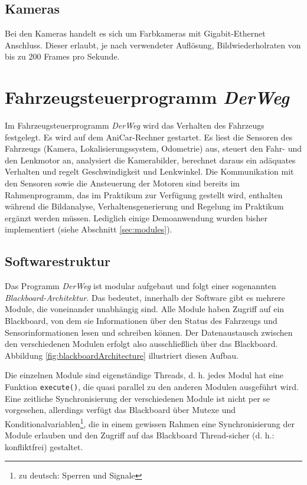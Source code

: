 \documentclass[a4paper, 11pt]{article}
\newcommand{\code}[1]{\texttt{#1}}
\newcommand{\DerWeg}{\textit{DerWeg }}  %
\begin{document}
{\subsection{Kameras}
Bei den Kameras handelt es sich um Farbkameras mit Gigabit-Ethernet Anschluss. Dieser erlaubt, je nach verwendeter Auflösung, Bildwiederholraten von bis zu 200 Frames pro Sekunde.

\section{Fahrzeugsteuerprogramm \DerWeg}

Im Fahrzeugsteuerprogramm \DerWeg wird das Verhalten des Fahrzeugs festgelegt. Es wird auf dem AniCar-Rechner gestartet. Es liest die Sensoren des Fahrzeugs (Kamera, Lokalisierungssystem, Odometrie) aus, steuert den Fahr- und den Lenkmotor an, analysiert die Kamerabilder, berechnet daraus ein adäquates Verhalten und regelt Geschwindigkeit und Lenkwinkel. Die Kommunikation mit den Sensoren sowie die Ansteuerung der Motoren sind bereits im Rahmenprogramm, das im Praktikum zur Verfügung gestellt wird, enthalten während die Bildanalyse, Verhaltensgenerierung und Regelung im Praktikum ergänzt werden müssen. Lediglich einige Demoanwendung wurden bisher implementiert (siehe Abschnitt \ref{sec:modules}).

\subsection{Softwarestruktur}

Das Programm \DerWeg ist modular aufgebaut und folgt einer sogenannten \textit{Blackboard-Architektur}. Das bedeutet, innerhalb der Software gibt es mehrere Module, die voneinander unabhängig sind. Alle Module haben Zugriff auf ein Blackboard, von dem sie Informationen über den Status des Fahrzeugs und Sensorinformationen lesen und schreiben können. Der Datenaustausch zwischen den verschiedenen Modulen erfolgt also ausschließlich über das Blackboard. Abbildung \ref{fig:blackboardArchitecture} illustriert diesen Aufbau.

Die einzelnen Module sind eigenständige Threads, d. h. jedes Modul hat eine Funktion \code{execute()}, die quasi parallel zu den anderen Modulen ausgeführt wird. Eine zeitliche Synchronisierung der verschiedenen Module ist nicht per se vorgesehen, allerdings verfügt das Blackboard über Mutexe und Konditionalvariablen\footnote{zu deutsch: Sperren und Signale}, die in einem gewissen Rahmen eine Synchronisierung der Module erlauben und den Zugriff auf das Blackboard Thread-sicher (d. h.: konfliktfrei) gestaltet.

}
\end{document}
